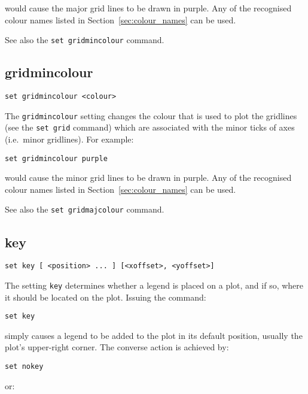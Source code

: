 \noindent would cause the major grid lines to be drawn in purple. Any of the recognised
colour names listed in Section~\ref{sec:colour_names} can be used.

See also the {\tt set gridmincolour} command.


\subsection{gridmincolour}

\begin{verbatim}
set gridmincolour <colour>
\end{verbatim}

The {\tt gridmincolour} setting changes the colour that is used to plot the
gridlines (see the {\tt set grid} command) which are associated with the minor
ticks of axes (i.e.\ minor gridlines). For example:

\begin{verbatim}
set gridmincolour purple
\end{verbatim}

\noindent would cause the minor grid lines to be drawn in purple. Any of the recognised
colour names listed in Section~\ref{sec:colour_names} can be used.

See also the {\tt set gridmajcolour} command.


\subsection{key}

\begin{verbatim}
set key [ <position> ... ] [<xoffset>, <yoffset>]
\end{verbatim}

The setting {\tt key} determines whether a legend is placed on a plot, and if
so, where it should be located on the plot. Issuing the command:

\begin{verbatim}
set key
\end{verbatim}

\noindent simply causes a legend to be added to the plot in its default position, usually
the plot's upper-right corner. The converse action is achieved by:

\begin{verbatim}
set nokey
\end{verbatim}

\noindent or:

